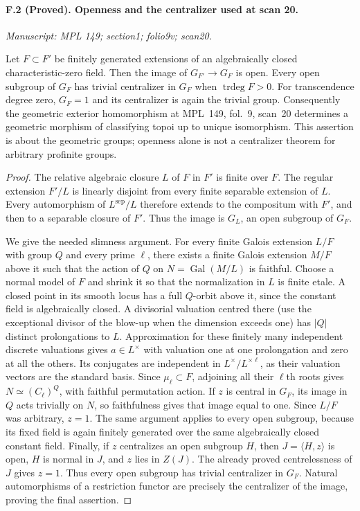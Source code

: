 \paragraph{F.2 (Proved). Openness and the centralizer used at scan 20.}
\textit{Manuscript: MPL 149; section1; folio9v; scan20.}

Let $F\subset F'$ be finitely generated extensions of an algebraically
closed characteristic-zero field. Then the image of
$G_{F'}\to G_F$ is open. Every open subgroup of $G_F$ has trivial
centralizer in $G_F$ when $\operatorname{trdeg}F>0$. For transcendence
degree zero, $G_F=1$ and its centralizer is again the trivial group.
Consequently the geometric exterior homomorphism at MPL~149, fol.~9,
scan~20 determines a geometric morphism of classifying topoi up to unique
isomorphism. This assertion is about the geometric groups; openness alone
is not a centralizer theorem for arbitrary profinite groups.

\begin{proof}
The relative algebraic closure $L$ of $F$ in $F'$ is finite over $F$.
The regular extension $F'/L$ is linearly disjoint from every finite
separable extension of $L$. Every automorphism of $L^{\mathrm{sep}}/L$
therefore extends to the compositum with $F'$, and then to a separable
closure of $F'$. Thus the image is $G_L$, an open subgroup of $G_F$.

We give the needed slimness argument. For every finite Galois extension
$L/F$ with group $Q$ and every prime $\ell$, there exists a finite Galois
extension $M/F$ above it such that the action of $Q$ on
$N=\operatorname{Gal}(M/L)$ is faithful. Choose a normal model of $F$ and
shrink it so that the normalization in $L$ is finite etale. A closed point
in its smooth locus has a full $Q$-orbit above it, since the constant field
is algebraically closed. A divisorial valuation centred there (use the
exceptional divisor of the blow-up when the dimension exceeds one) has
$|Q|$ distinct prolongations to $L$. Approximation for these finitely many
independent discrete valuations gives $a\in L^\times$ with valuation one
at one prolongation and zero at all the others. Its conjugates are
independent in $L^\times/L^{\times\ell}$, as their valuation vectors are
the standard basis. Since $\mu_\ell\subset F$, adjoining all their
$\ell$th roots gives $N\simeq(C_\ell)^Q$, with faithful permutation action.
If $z$ is central in $G_F$, its image in $Q$ acts trivially on $N$,
so faithfulness gives that image equal to one. Since $L/F$ was arbitrary,
$z=1$. The same argument applies to every open subgroup, because its fixed
field is again finitely generated over the same algebraically closed
constant field. Finally, if $z$ centralizes an open subgroup $H$, then
$J=\langle H,z\rangle$ is open, $H$ is normal in $J$, and $z$ lies in
$Z(J)$. The already proved centrelessness of $J$ gives $z=1$. Thus every
open subgroup has trivial centralizer in $G_F$. Natural automorphisms of a restriction functor are precisely
the centralizer of the image, proving the final assertion.
\end{proof}

